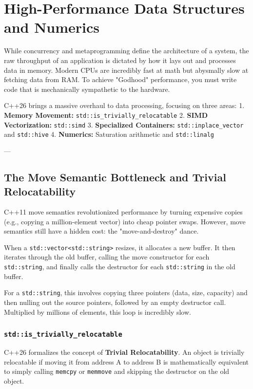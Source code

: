 \chapter{High-Performance Data Structures and Numerics}

While concurrency and metaprogramming define the architecture of a system, the raw throughput of an application is dictated by how it lays out and processes data in memory. Modern CPUs are incredibly fast at math but abysmally slow at fetching data from RAM. To achieve "Godhood" performance, you must write code that is mechanically sympathetic to the hardware.

C++26 brings a massive overhaul to data processing, focusing on three areas:
1. \textbf{Memory Movement:} \texttt{std::is_trivially_relocatable}
2. \textbf{SIMD Vectorization:} \texttt{std::simd}
3. \textbf{Specialized Containers:} \texttt{std::inplace_vector} and \texttt{std::hive}
4. \textbf{Numerics:} Saturation arithmetic and \texttt{std::linalg}

---

\section{The Move Semantic Bottleneck and Trivial Relocatability}

C++11 move semantics revolutionized performance by turning expensive copies (e.g., copying a million-element vector) into cheap pointer swaps. However, move semantics still have a hidden cost: the "move-and-destroy" dance.

When a \texttt{std::vector<std::string>} resizes, it allocates a new buffer. It then iterates through the old buffer, calling the move constructor for each \texttt{std::string}, and finally calls the destructor for each \texttt{std::string} in the old buffer.

For a \texttt{std::string}, this involves copying three pointers (data, size, capacity) and then nulling out the source pointers, followed by an empty destructor call. Multiplied by millions of elements, this loop is incredibly slow.

\subsection{\texttt{std::is_trivially_relocatable}}

C++26 formalizes the concept of \textbf{Trivial Relocatability}. An object is trivially relocatable if moving it from address A to address B is mathematically equivalent to simply calling \texttt{memcpy} or \texttt{memmove} and skipping the destructor on the old object.

